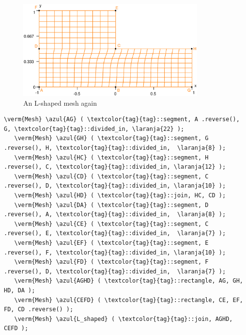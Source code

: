 \begin{figure}[ht] \centering
  \includegraphics[width=95mm]{L-shaped-distorted}
  \caption{An L-shaped mesh again}
  \label{\numb section 2.\numb fig 1}
\end{figure}

\begin{Verbatim}[commandchars=\\\{\},formatcom=\small\tt,frame=single,
   label=parag-\ref{\numb section 2.\numb parag 1}.cpp,rulecolor=\color{coment},
   baselinestretch=0.94,framesep=2mm]
   \verm{Mesh} \azul{AG} ( \textcolor{tag}{tag}::segment, A .reverse(), G, \textcolor{tag}{tag}::divided_in, \laranja{22} );
   \verm{Mesh} \azul{GH} ( \textcolor{tag}{tag}::segment, G .reverse(), H, \textcolor{tag}{tag}::divided_in,  \laranja{8} );
   \verm{Mesh} \azul{HC} ( \textcolor{tag}{tag}::segment, H .reverse(), C, \textcolor{tag}{tag}::divided_in, \laranja{12} );
   \verm{Mesh} \azul{CD} ( \textcolor{tag}{tag}::segment, C .reverse(), D, \textcolor{tag}{tag}::divided_in, \laranja{10} );
   \verm{Mesh} \azul{HD} ( \textcolor{tag}{tag}::join, HC, CD );
   \verm{Mesh} \azul{DA} ( \textcolor{tag}{tag}::segment, D .reverse(), A, \textcolor{tag}{tag}::divided_in,  \laranja{8} );
   \verm{Mesh} \azul{CE} ( \textcolor{tag}{tag}::segment, C .reverse(), E, \textcolor{tag}{tag}::divided_in,  \laranja{7} );
   \verm{Mesh} \azul{EF} ( \textcolor{tag}{tag}::segment, E .reverse(), F, \textcolor{tag}{tag}::divided_in, \laranja{10} );
   \verm{Mesh} \azul{FD} ( \textcolor{tag}{tag}::segment, F .reverse(), D, \textcolor{tag}{tag}::divided_in,  \laranja{7} );
   \verm{Mesh} \azul{AGHD} ( \textcolor{tag}{tag}::rectangle, AG, GH, HD, DA );
   \verm{Mesh} \azul{CEFD} ( \textcolor{tag}{tag}::rectangle, CE, EF, FD, CD .reverse() );
   \verm{Mesh} \azul{L_shaped} ( \textcolor{tag}{tag}::join, AGHD, CEFD );
\end{Verbatim}

